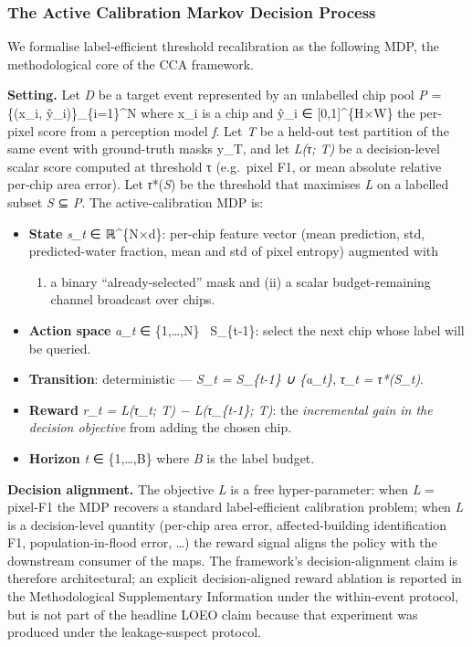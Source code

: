 \subsubsection{The Active Calibration Markov Decision Process}\label{the-active-calibration-markov-decision-process}

We formalise label-efficient threshold recalibration as the following MDP,
the methodological core of the CCA framework.

\textbf{Setting.} Let \emph{D} be a target event represented by an unlabelled chip pool
\emph{P} = \{(x\_i, ŷ\_i)\}\_\{i=1\}\^{}N where x\_i is a chip and ŷ\_i ∈ {[}0,1{]}\^{}\{H×W\} the
per-pixel score from a perception model \emph{f}. Let \emph{T} be a held-out test
partition of the same event with ground-truth masks y\_T, and let \emph{L(τ; T)} be
a decision-level scalar score computed at threshold τ (e.g.~pixel F1, or
mean absolute relative per-chip area error). Let \emph{τ}*(\emph{S}) be the threshold
that maximises \emph{L} on a labelled subset \emph{S} ⊆ \emph{P}. The active-calibration
MDP is:

\begin{itemize}
\tightlist
\item
  \textbf{State} \emph{s\_t} ∈ ℝ\^{}\{N×d\}: per-chip feature vector (mean prediction, std,
  predicted-water fraction, mean and std of pixel entropy) augmented with

  \begin{enumerate}
  \def\labelenumi{(\roman{enumi})}
  \tightlist
  \item
    a binary ``already-selected'' mask and (ii) a scalar
    budget-remaining channel broadcast over chips.
  \end{enumerate}
\item
  \textbf{Action space} \emph{a\_t} ∈ \{1,\ldots,N\} ~S\_\{t-1\}: select the next chip whose
  label will be queried.
\item
  \textbf{Transition}: deterministic --- \emph{S\_t = S\_\{t-1\} ∪ \{a\_t\}}, \emph{τ\_t = τ*(S\_t)}.
\item
  \textbf{Reward} \emph{r\_t = L(τ\_t; T) − L(τ\_\{t-1\}; T)}: the \emph{incremental gain in the
  decision objective} from adding the chosen chip.
\item
  \textbf{Horizon} \emph{t} ∈ \{1,\ldots,B\} where \emph{B} is the label budget.
\end{itemize}

\textbf{Decision alignment.} The objective \emph{L} is a free hyper-parameter: when
\emph{L} = pixel-F1 the MDP recovers a standard label-efficient calibration
problem; when \emph{L} is a decision-level quantity (per-chip area error,
affected-building identification F1, population-in-flood error, \ldots) the
reward signal aligns the policy with the downstream consumer of the maps.
The framework's decision-alignment claim is therefore architectural; an
explicit decision-aligned reward ablation is reported in the Methodological
Supplementary Information under the within-event protocol, but is not part of
the headline LOEO claim because that experiment was produced under the
leakage-suspect protocol.

